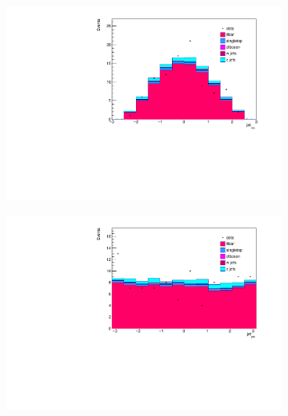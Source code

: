 \begin{figure}[H]
  \begin{subfigure}{0.5\textwidth}
    \centering
    \includegraphics[width=\linewidth]{plots_and_txt/stacked_plots/stacked_jet_eta.pdf}
    \caption{}
    \label{fig:stacked_lep_pt4}
  \end{subfigure}%
  \begin{subfigure}{0.5\textwidth}
    \centering
    \includegraphics[width=\linewidth]{plots_and_txt/stacked_plots/stacked_jet_phi.pdf}
    \caption{}
    \label{fig:stacked_btagged4}
  \end{subfigure}%
  \newline
  \begin{subfigure}{0.5\textwidth}
    \centering

\end{subfigure}
\end{figure}
